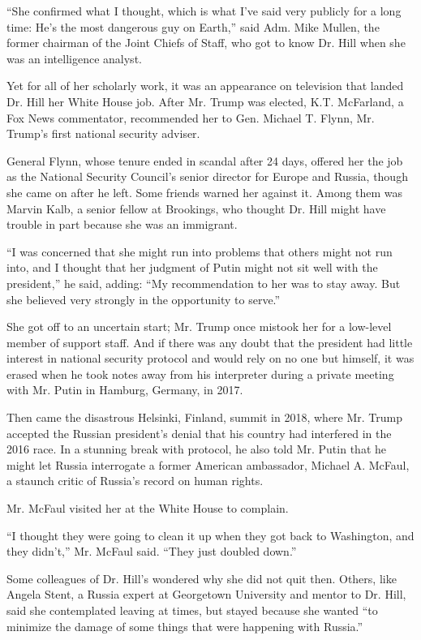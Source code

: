 ``She confirmed what I thought, which is what I've said very publicly
for a long time: He's the most dangerous guy on Earth,'' said Adm. Mike
Mullen, the former chairman of the Joint Chiefs of Staff, who got to
know Dr. Hill when she was an intelligence analyst.

Yet for all of her scholarly work, it was an appearance on television
that landed Dr. Hill her White House job. After Mr. Trump was elected,
K.T. McFarland, a Fox News commentator, recommended her to Gen. Michael
T. Flynn, Mr. Trump's first national security adviser.

General Flynn, whose tenure ended in scandal after 24 days, offered her
the job as the National Security Council's senior director for Europe
and Russia, though she came on after he left. Some friends warned her
against it. Among them was Marvin Kalb, a senior fellow at Brookings,
who thought Dr. Hill might have trouble in part because she was an
immigrant.

``I was concerned that she might run into problems that others might not
run into, and I thought that her judgment of Putin might not sit well
with the president,'' he said, adding: ``My recommendation to her was to
stay away. But she believed very strongly in the opportunity to serve.''

She got off to an uncertain start; Mr. Trump once mistook her for a
low-level member of support staff. And if there was any doubt that the
president had little interest in national security protocol and would
rely on no one but himself, it was erased when he took notes away from
his interpreter during a private meeting with Mr. Putin in Hamburg,
Germany, in 2017.

Then came the disastrous Helsinki, Finland, summit in 2018, where Mr.
Trump accepted the Russian president's denial that his country had
interfered in the 2016 race. In a stunning break with protocol, he also
told Mr. Putin that he might let Russia interrogate a former American
ambassador, Michael A. McFaul, a staunch critic of Russia's record on
human rights.

Mr. McFaul visited her at the White House to complain.

``I thought they were going to clean it up when they got back to
Washington, and they didn't,'' Mr. McFaul said. ``They just doubled
down.''

Some colleagues of Dr. Hill's wondered why she did not quit then.
Others, like Angela Stent, a Russia expert at Georgetown University and
mentor to Dr. Hill, said she contemplated leaving at times, but stayed
because she wanted ``to minimize the damage of some things that were
happening with Russia.''

